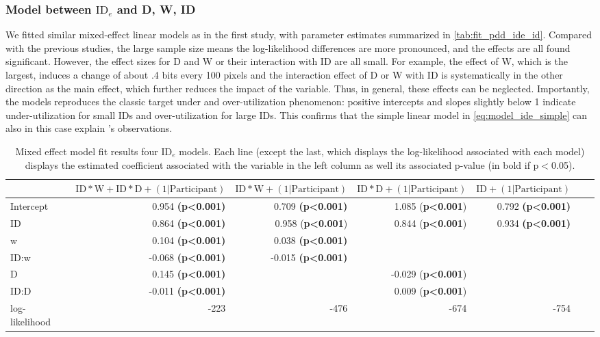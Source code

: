 \documentclass[acmlarge, manuscript,review]{acmart}
\newcommand{\ide}{\ensuremath{{\text{ID}_e}}\xspace}
\newcommand{\D}{\ensuremath{{\text{D}}}\xspace}
\newcommand{\W}{\ensuremath{{\text{W}}}\xspace}
\begin{document}
\subsubsection{Model between \ide and D, W, ID}
We fitted similar mixed-effect linear models as in the first study, with parameter estimates summarized in \autoref{tab:fit_pdd_ide_id}. Compared with the previous studies, the large sample size means the log-likelihood differences are more pronounced, and the effects are all found significant. However, the effect sizes for D and W or their interaction with ID are all small. For example, the effect of W, which is the largest, induces a change of about .4 bits every 100 pixels and the interaction effect of D or W with ID is systematically in the other direction as the main effect, which further reduces the impact of the variable. Thus, in general, these effects can be neglected.
Importantly, the models reproduces the classic target under and over-utilization phenomenon: positive intercepts and slopes slightly below 1 indicate under-utilization for small IDs and over-utilization for large IDs. This confirms that the simple linear model in \autoref{eq:model_ide_simple} can also in this case explain \citeauthor{zhai2004nominal}'s observations.

\begin{table}
  \caption{Mixed effect model fit results four \ide models. Each line (except the last, which displays the log-likelihood associated with each model) displays the estimated coefficient associated with the variable in the left column as well its associated p-value (in bold if p$<$0.05).}
  \label{tab:fit_pdd_ide_id}
  \begin{center}
    \begin{tabular}{lrrrrrr}
      \hline
      &  $\text{ID}*\W + \text{ID}*\D + (1|\text{Participant})$ & $\text{ID}*\W + (1|\text{Participant})$ &  $ \text{ID}*\D + (1|\text{Participant})$ & $\text{ID}+ (1|\text{Participant})$  \\
      \hline
      Intercept &  0.954 \textbf{(p\textless0.001)} &            0.709 \textbf{(p\textless0.001)} & 1.085 (\textbf{p\textless0.001})  & 0.792 \textbf{(p\textless0.001)} \\
      ID        &  0.864 \textbf{(p\textless0.001)} &    0.958 (\textbf{p\textless0.001}) &  0.844 (\textbf{p\textless0.001}) & 0.934 \textbf{(p\textless0.001)}  \\
      w         & 0.104 \textbf{(p\textless0.001)} & 0.038 \textbf{(p\textless0.001)}    &   & \\
      ID:w      & -0.068 \textbf{(p\textless0.001)} &    -0.015 \textbf{(p\textless0.001)}  &   & \\
      D         &  0.145 \textbf{(p\textless0.001)} &    &  -0.029 (\textbf{p\textless0.001})  & \\
      ID:D      & -0.011 \textbf{(p\textless0.001)} &     & 0.009 (\textbf{p\textless0.001})   & \\
      log-likelihood & -223 & -476 & -674  & -754\\
      \hline
    \end{tabular}
  \end{center}
\end{table}
\end{document}
